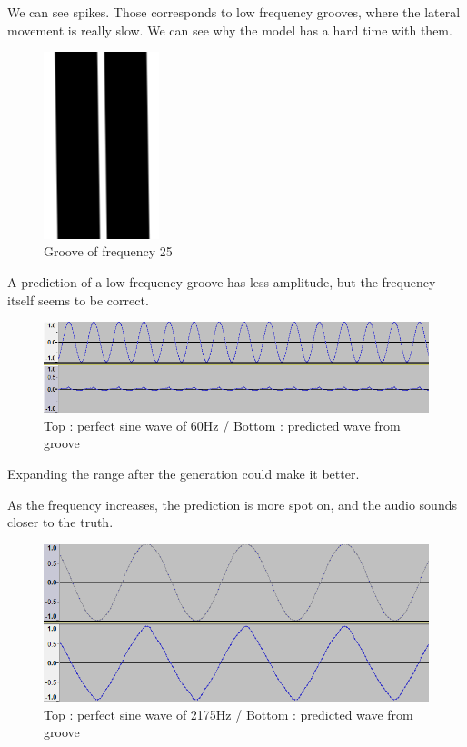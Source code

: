 \documentclass[12pt, twoside]{article}
\begin{document}
We can see spikes. Those corresponds to low frequency grooves, where the lateral movement is really slow. We can see why the model has a hard time with them.

\begin{figure}[H]
	\centering
	\includegraphics[width=0.3\textwidth]{../images/low_freq.png}
	\caption{Groove of frequency 25}
	\label{lowfreq}
\end{figure}

A prediction of a low frequency groove has less amplitude, but the frequency itself seems to be correct.

\begin{figure}[H]
	\centering
	\includegraphics[width=1.0\textwidth]{../images/pred_60.png}
	\caption{Top : perfect sine wave of 60Hz / Bottom : predicted wave from groove}
	\label{pred60}
\end{figure}

Expanding the range after the generation could make it better.

As the frequency increases, the prediction is more spot on, and the audio sounds closer to the truth. 

\begin{figure}[H]
	\centering
	\includegraphics[width=1.0\textwidth]{../images/pred_2175.png}
	\caption{Top : perfect sine wave of 2175Hz / Bottom : predicted wave from groove}
	\label{pred2175}
\end{figure}
\end{document}
